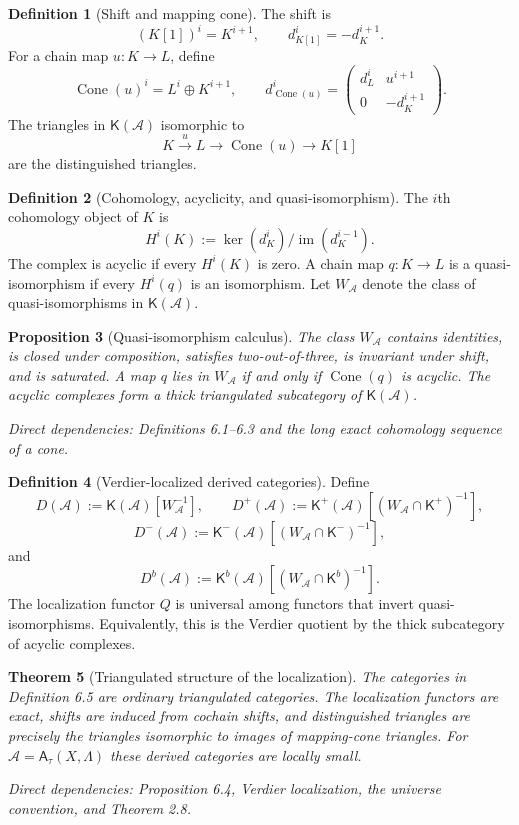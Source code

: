 \documentclass[10pt]{article}
\newtheorem{theorem}{Theorem}[section]
\newtheorem{proposition}[theorem]{Proposition}
\theoremstyle{definition}
\newtheorem{definition}[theorem]{Definition}
\newcommand{\Lam}{\Lambda}
\newcommand{\Kcat}{\mathsf{K}}
\newcommand{\Cone}{\operatorname{Cone}}
\newcommand{\dep}[1]{\par\smallskip\noindent\textit{Direct dependencies: #1}}
\begin{document}
\begin{definition}[Shift and mapping cone]
The shift is
\[
(K[1])^i=K^{i+1},\qquad d_{K[1]}^i=-d_K^{i+1}.
\]
For a chain map $u:K\to L$, define
\[
\Cone(u)^i=L^i\oplus K^{i+1},\qquad
d_{\Cone(u)}^i=
\begin{pmatrix}d_L^i&u^{i+1}\\0&-d_K^{i+1}\end{pmatrix}.
\]
The triangles in $\Kcat(\mathcal A)$ isomorphic to
\[
K\xrightarrow{u}L\longrightarrow\Cone(u)\longrightarrow K[1]
\]
are the distinguished triangles.
\end{definition}

\begin{definition}[Cohomology, acyclicity, and quasi-isomorphism]
The $i$th cohomology object of $K$ is
\[
H^i(K):=\ker(d_K^i)/\operatorname{im}(d_K^{i-1}).
\]
The complex is acyclic if every $H^i(K)$ is zero.  A chain map $q:K\to L$
is a quasi-isomorphism if every $H^i(q)$ is an isomorphism.  Let $W_\mathcal A$
denote the class of quasi-isomorphisms in $\Kcat(\mathcal A)$.
\end{definition}

\begin{proposition}[Quasi-isomorphism calculus]
The class $W_\mathcal A$ contains identities, is closed under composition,
satisfies two-out-of-three, is invariant under shift, and is saturated.  A map
$q$ lies in $W_\mathcal A$ if and only if $\Cone(q)$ is acyclic.  The acyclic
complexes form a thick triangulated subcategory of $\Kcat(\mathcal A)$.
\dep{Definitions 6.1--6.3 and the long exact cohomology sequence of a cone.}
\end{proposition}

\begin{definition}[Verdier-localized derived categories]
Define
\[
D(\mathcal A):=\Kcat(\mathcal A)[W_\mathcal A^{-1}],\qquad
D^+(\mathcal A):=\Kcat^+(\mathcal A)[(W_\mathcal A\cap\Kcat^+)^{-1}],
\]
\[
D^-(\mathcal A):=\Kcat^-(\mathcal A)[(W_\mathcal A\cap\Kcat^-)^{-1}],
\]
and
\[
D^b(\mathcal A):=\Kcat^b(\mathcal A)[(W_\mathcal A\cap\Kcat^b)^{-1}].
\]
The localization functor $Q$ is universal among functors that invert
quasi-isomorphisms.  Equivalently, this is the Verdier quotient by the thick
subcategory of acyclic complexes.
\end{definition}

\begin{theorem}[Triangulated structure of the localization]
The categories in Definition 6.5 are ordinary triangulated categories.  The
localization functors are exact, shifts are induced from cochain shifts, and
distinguished triangles are precisely the triangles isomorphic to images of
mapping-cone triangles.  For $\mathcal A=\mathsf A_\tau(X,\Lam)$ these derived
categories are locally small.
\dep{Proposition 6.4, Verdier localization, the universe convention, and
Theorem 2.8.}
\end{theorem}
\end{document}
